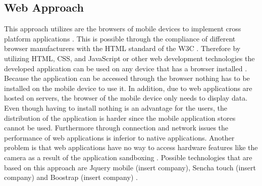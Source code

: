 \documentclass[Bachelor,BIF,english]{twbook}
\begin{document}
\subsection{Web Approach}
This approach utilizes are the browsers of mobile devices to implement cross platform applications \cite[p.~2]{7934674}. This is possible through the compliance of different browser manufacturers with the HTML standard of the W3C \cite[p.~2]{LinckArne2016}. Therefore by utilizing HTML, CSS, and JavaScript or other web development technologies the developed application can be used on any device that has a browser installed \cite[p.~2]{7934674}.
\\[\baselineskip]
Because the application can be accessed through the browser nothing has to be installed on the mobile device to use it. In addition, due to web applications are hosted on servers, the browser of the mobile device only needs to display data. Even though having to install nothing is an advantage for the users, the distribution of the application is harder since the mobile application stores cannot be used. Furthermore through connection and network issues the performance of web applications is inferior to native applications. Another problem is that web applications have no way to access hardware features like the camera as a result of the application sandboxing \cite[p.~626]{6420693}. Possible technologies that are based on this approach are Jquery mobile (insert company), Sencha touch (insert company) and Boostrap (insert company) \cite[p.~2]{7934674}.
\end{document}
